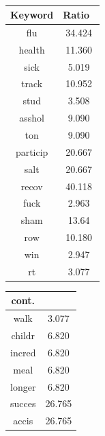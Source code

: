 \documentclass{acm_proc_article-sp}
\begin{document}


%

%
%

\appendix
\ 


\begin{table}[!ht]
\centering
\begin{tabular}{|c|c|}\hline
Keyword&Ratio\ \\ \hline
flu &  34.424\\ \hline
health &  11.360\\ \hline
sick &  5.019\\ \hline
track & 10.952 \\ \hline
stud & 3.508 \\ \hline
asshol & 9.090 \\ \hline
ton & 9.090 \\ \hline
particip & 20.667 \\ \hline
salt & 20.667 \\ \hline
recov & 40.118 \\ \hline
fuck & 2.963 \\ \hline
sham & 13.64 \\ \hline
row & 10.180 \\ \hline
win & 2.947 \\ \hline
rt & 3.077 \\ \hline
  \end{tabular}
  \hspace{1em}
\begin{tabular}{|c|c|}\hline
cont. & \\ \hline
walk & 3.077 \\ \hline
childr & 6.820 \\ \hline
incred & 6.820 \\ \hline
meal & 6.820 \\ \hline
longer &  6.820 \\ \hline
succes &  26.765 \\ \hline
accis & 26.765 \\ \hline

\end{tabular}
\end{table}
\end{document}
